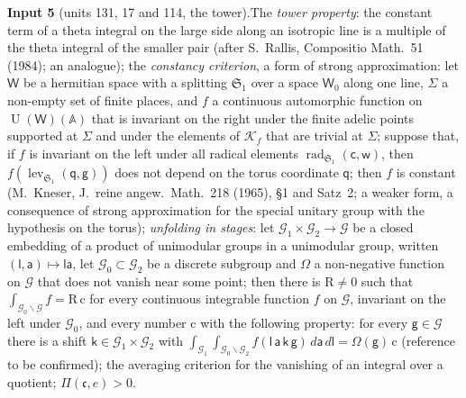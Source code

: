 \documentclass[11pt,a4paper]{article}
\theoremstyle{plainx}
\theoremstyle{uprightx}
\newcommand{\sW}{\mathsf{W}}
\newcommand{\sg}{\mathsf{g}}
\newcommand{\sk}{\mathsf{k}}
\newcommand{\sq}{\mathsf{q}}
\newcommand{\fc}{\mathfrak{c}}
\newcommand{\fS}{\mathfrak{S}}
\newcommand{\rc}{\mathrm{c}}
\newcommand{\A}{\mathbb{A}}
\newcommand{\U}{\operatorname{U}}
\newcommand{\LP}[2]{\Pi(#1,#2)}
\begin{document}
{\vspace{3pt}\label{i:tower}\textbf{Input 5} (units 131, 17 and 114, the tower).\enspace The
\emph{tower property}: the constant term of a theta integral on the large side along an isotropic line is a
multiple of the theta integral of the smaller pair (after S.~Rallis, Compositio Math.\ 51 (1984); an analogue);
the \emph{constancy criterion}, a form of strong approximation: let $\sW$ be a hermitian space with a splitting
$\fS_1$ over a space $\sW_0$ along one line, $\Sigma$ a non-empty set of finite places, and $f$ a continuous
automorphic function on $\U(\sW)(\A)$ that is invariant on the right under the finite adelic points supported at
$\Sigma$ and under the elements of $\mathcal{K}_f$ that are trivial at $\Sigma$; suppose that, if $f$ is invariant on
the left under all radical elements $\operatorname{rad}_{\fS_1}(\mathsf{c},\mathsf{w})$, then
$f(\operatorname{lev}_{\fS_1}(\sq,\sg))$ does not depend on the torus coordinate $\sq$; then $f$ is constant
(M.~Kneser, J.~reine angew.\ Math.\ 218 (1965), §1 and Satz~2; a weaker form, a consequence of strong
approximation for the special unitary group with the hypothesis on the torus); \emph{unfolding in stages}: let
$\mathcal{G}_1\times\mathcal{G}_2\to\mathcal{G}$ be a closed embedding of a product of unimodular groups in a unimodular
group, written $(\mathsf{l},\mathsf{a})\mapsto\mathsf{l}\mathsf{a}$, let $\mathcal{G}_0\subset\mathcal{G}_2$ be a discrete
subgroup and $\Omega$ a non-negative function on $\mathcal{G}$ that does not vanish near some point; then there is
$\mathrm{R}\ne0$ such that $\int_{\mathcal{G}_0\backslash\mathcal{G}}f=\mathrm{R}\,\rc$ for every continuous integrable
function $f$ on $\mathcal{G}$, invariant on the left under $\mathcal{G}_0$, and every number $\rc$ with the following
property: for every $\sg\in\mathcal{G}$ there is a shift $\sk\in\mathcal{G}_1\times\mathcal{G}_2$ with
$\int_{\mathcal{G}_1}\int_{\mathcal{G}_0\backslash\mathcal{G}_2}f(\mathsf{l}\,\mathsf{a}\,\sk\,\sg)\,d\mathsf{a}\,d\mathsf{l}=\Omega(\sg)\,\rc$
(reference to be confirmed); the averaging criterion for the vanishing of an integral over a quotient;
$\LP{\fc}{e}>0$.}
\end{document}
